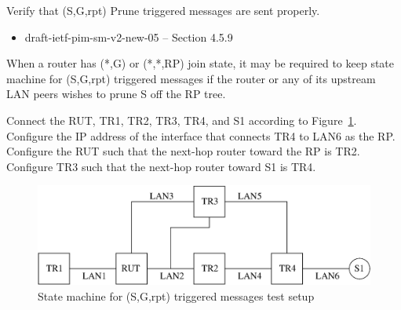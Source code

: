 \documentclass[11pt]{report}
\begin{document}
Verify that (S,G,rpt) Prune triggered messages are sent properly.

\begin{itemize}
  \item draft-ietf-pim-sm-v2-new-05 -- Section 4.5.9
\end{itemize}

When a router has (*,G) or (*,*,RP) join state, it may be required to keep
state machine for (S,G,rpt) triggered messages if the router or any of its
upstream LAN peers wishes to prune S off the RP tree.

Connect the RUT, TR1, TR2, TR3, TR4, and S1 according to
Figure~\ref{fig:pim_test_4_9_state_machine_for_sg_rpt_triggered_messages}.
Configure the IP address of the interface that connects TR4 to LAN6 as the RP.
Configure the RUT such that the next-hop router toward the RP is TR2.
Configure TR3 such that the next-hop router toward S1 is TR4.

\begin{figure}[htbp]
  \begin{center}
    \includegraphics[scale=0.8]{figs/pim_test_4_9_state_machine_for_sg_rpt_triggered_messages}
    \caption{State machine for (S,G,rpt) triggered messages test setup}
    \label{fig:pim_test_4_9_state_machine_for_sg_rpt_triggered_messages}
  \end{center}
\end{figure}


\end{document}
